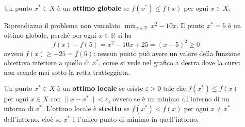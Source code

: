 \begin{definizione}
Un punto $x^* \in X$ è un \textbf{ottimo globale} se $f(x^*) \le f(x)$ per ogni $x \in X$.
\end{definizione}

\begin{esempiofig}
Riprendiamo il problema non vincolato $\min_{x \in \mathbb{R}} \, x^2 - 10x$. Il punto $x^* = 5$ è un ottimo globale, perché per ogni $x \in \mathbb{R}$ si ha
\[
f(x) - f(5) = x^2 - 10x + 25 = (x - 5)^2 \ge 0
\]
ovvero $f(x) \ge -25 = f(5)$: nessun punto può avere un valore della funzione obiettivo inferiore a quello di $x^*$, come si vede nel grafico a destra dove la curva non scende mai sotto la retta tratteggiata.
\tcblower
{}
\end{esempiofig}

\begin{definizione}
Un punto $x^* \in X$ è un \textbf{ottimo locale} se esiste $\varepsilon > 0$ tale che $f(x^*) \le f(x)$ per ogni $x \in X$ con $\|x - x^*\| < \varepsilon$, ovvero se è un minimo all'interno di un intorno di $x^*$. L'ottimo locale è \textbf{stretto} se $f(x^*) < f(x)$ per ogni $x \neq x^*$ dell'intorno, cioè se $x^*$ è l'unico punto di minimo in quell'intorno.
\end{definizione}

